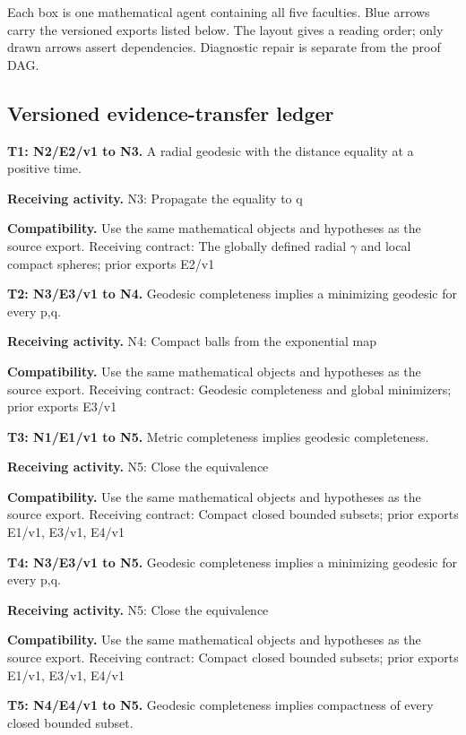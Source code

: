 \documentclass[preprint,12pt,aps,pra,showkeys,amsmath,amssymb,superscriptaddress,floatfix]{revtex4-2}
\theoremstyle{definition}
\theoremstyle{remark}
\newcommand{\field}[2]{\par\smallskip\noindent\textbf{#1.} #2\par}
\begin{document}
Each box is one mathematical agent containing all five faculties. Blue
arrows carry the versioned exports listed below. The layout gives a
reading order; only drawn arrows assert dependencies. Diagnostic repair
is separate from the proof DAG.

\clearpage\subsection{Versioned evidence-transfer ledger}

\begingroup\small\linespread{1.05}\selectfont

\field{T1: N2/E2/v1 to N3}{A radial geodesic with the distance equality at a positive time.}

\field{Receiving activity}{N3: Propagate the equality to q}

\field{Compatibility}{Use the same mathematical objects and hypotheses as the source export.
Receiving contract: The globally defined radial \(\gamma\) and local
compact spheres; prior exports E2/v1}

\field{T2: N3/E3/v1 to N4}{Geodesic completeness implies a minimizing geodesic for every p,q.}

\field{Receiving activity}{N4: Compact balls from the exponential map}

\field{Compatibility}{Use the same mathematical objects and hypotheses as the source export.
Receiving contract: Geodesic completeness and global minimizers; prior
exports E3/v1}

\field{T3: N1/E1/v1 to N5}{Metric completeness implies geodesic completeness.}

\field{Receiving activity}{N5: Close the equivalence}

\field{Compatibility}{Use the same mathematical objects and hypotheses as the source export.
Receiving contract: Compact closed bounded subsets; prior exports E1/v1,
E3/v1, E4/v1}

\field{T4: N3/E3/v1 to N5}{Geodesic completeness implies a minimizing geodesic for every p,q.}

\field{Receiving activity}{N5: Close the equivalence}

\field{Compatibility}{Use the same mathematical objects and hypotheses as the source export.
Receiving contract: Compact closed bounded subsets; prior exports E1/v1,
E3/v1, E4/v1}

\field{T5: N4/E4/v1 to N5}{Geodesic completeness implies compactness of every closed bounded
subset.}
\end{document}
